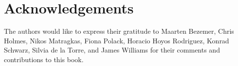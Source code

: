 \chapter*{Acknowledgements}
\label{sec:Acknowledgements}

The authors would like to express their gratitude to Maarten Bezemer, Chris Holmes, Nikos Matragkas, Fiona Polack, Horacio Hoyos Rodriguez, Konrad Schwarz, Silvia de la Torre, and James Williams for their comments and contributions to this book.